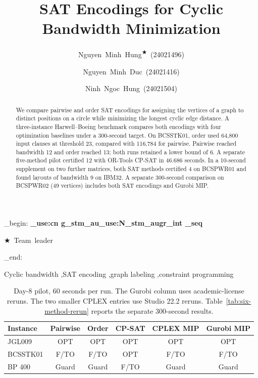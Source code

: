 \documentclass[a4paper,fleqn]{cas-sc}
\begin{document}
\ExplSyntaxOn
\RenewDocumentCommand \stmauthors {}
  {
    \group_begin: 
    \centering \small \bfseries
    \seq_use:cn { g_stm_au\int_use:N\g_stm_augr_int _seq } { \qquad }
    \par \smallskip
    \normalfont \footnotesize \( \bigstar \)~Team~leader \par
    \group_end:
  }
\ExplSyntaxOff
\title[mode=title,align=\centering,weight=\bfseries]{SAT Encodings for Cyclic Bandwidth Minimization}
\author{\mbox{Nguyen Minh Hung\texorpdfstring{\textsuperscript{\(\bigstar\)}}{}}~\mbox{(24021496)}}
\author{\mbox{Nguyen Minh Duc}~\mbox{(24021416)}}
\author{\mbox{Ninh Ngoc Hung}~\mbox{(24021504)}}
\begin{abstract}
We compare pairwise and order SAT encodings for assigning the vertices of
a graph to distinct positions on a circle while minimizing the longest
cyclic edge distance. A three-instance Harwell--Boeing benchmark compares
both encodings with four optimization baselines under a 300-second target.
On BCSSTK01, order used 64,800 input clauses at threshold 23, compared
with 116,784 for pairwise. Pairwise reached bandwidth 12 and order reached
13; both runs retained a lower bound of 6. A separate five-method pilot
certified 12 with OR-Tools CP-SAT in 46.686 seconds. In a 10-second
supplement on two further matrices, both SAT methods certified 4 on
BCSPWR01 and found layouts of bandwidth 9 on IBM32. A separate 300-second comparison on BCSPWR02 (49 vertices) includes both SAT encodings and Gurobi MIP.
\end{abstract}
\begin{keywords}
Cyclic bandwidth \sep SAT encoding \sep graph labeling \sep constraint programming
\end{keywords}
\maketitle







\begin{table}[t]
\centering
\small
\caption{Day-8 pilot, 60 seconds per run. The Gurobi column uses academic-license reruns. The two smaller CPLEX entries use Studio 22.2 reruns. Table~\ref{tab:six-method-rerun} reports the separate 300-second results.}
\label{tab:day8-pilot}
\begin{tabular}{lccccc}
\hline
Instance & Pairwise & Order & CP-SAT & CPLEX MIP & Gurobi MIP \\
\hline
JGL009 & OPT & OPT & OPT & OPT & OPT \\
BCSSTK01 & F/TO & F/TO & OPT & F/TO & F/TO \\
BP 400 & Guard & Guard & F/TO & Guard & Guard \\
\hline
\end{tabular}
\end{table}

\end{document}
